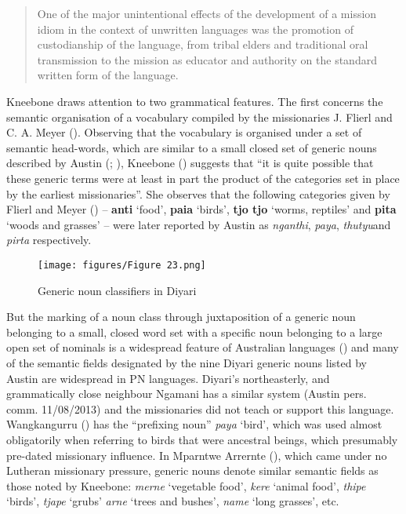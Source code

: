 \begin{quote}
    One of the major unintentional effects of the development of a mission idiom in the context of unwritten languages was the promotion of custodianship of the language, from tribal elders and traditional oral transmission to the mission as educator and authority on the standard written form of the language. \citep[4]{kneebone_language_2005}
\end{quote}

Kneebone draws attention to two grammatical features. The first concerns the semantic organisation of a vocabulary compiled by the missionaries J. Flierl and C. A. Meyer (\citealt{flierl_wonini-pepa_1883}). Observing that the vocabulary is organised under a set of semantic head-words, which are similar to a small closed set of generic nouns described by Austin (\citeyear[44]{austin_grammar_2013}; ), Kneebone (\citeyear[83]{kneebone_language_2005}) suggests that “it is quite possible that these generic terms were at least in part the product of the categories set in place by the earliest missionaries”. She observes that the following categories given by Flierl and Meyer (\citeyear{flierl_1843}) – \textbf{anti} `food', \textbf{paia} `birds', \textbf{tjo tjo} `worms, reptiles' and \textbf{pita} `woods and grasses' – were later reported by Austin as \textit{nganthi}, \textit{paya}, \textit{thutyu}and \textit{pirta} respectively.

\begin{figure}
\texttt{[image: figures/Figure 23.png]}
\caption{Generic noun classifiers in Diyari \citep[44]{austin_grammar_2013}}
\label{fig:2:23}
\end{figure} 

But the marking of a noun class through juxtaposition of a generic noun belonging to a small, closed word set with a specific noun belonging to a large open set of nominals is a widespread feature of Australian languages (\citealt[102]{dixon_languages_1980}) and many of the semantic fields designated by the nine Diyari generic nouns listed by Austin are widespread in PN languages. Diyari’s northeasterly, and grammatically close neighbour Ngamani has a similar system (Austin pers. comm. 11/08/2013) and the missionaries did not teach or support this language. Wangkangurru (\citealt[102]{hercus_grammar_1994}) has the “prefixing noun” \textit{paya} `bird', which was used almost obligatorily when referring to birds that were ancestral beings, which presumably pre-dated missionary influence. In Mparntwe Arrernte (\citealt[107]{wilkins_mparntwe_1989}), which came under no Lutheran missionary pressure, generic nouns denote similar semantic fields as those noted by Kneebone: \textit{merne} `vegetable food', \textit{kere} `animal food', \textit{thipe} `birds', \textit{tjape} `grubs' \textit{arne} `trees and bushes', \textit{name} `long grasses', etc. 

